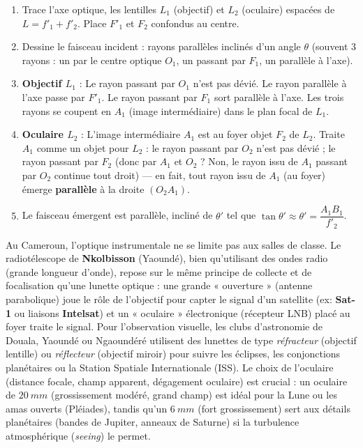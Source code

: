 \documentclass[11pt]{article}
\begin{document}
\begin{methode}
\begin{enumerate}
\item Trace l'axe optique, les lentilles $L_1$ (objectif) et $L_2$ (oculaire) espacées de $L = f'_1 + f'_2$. Place $F'_1$ et $F_2$ confondus au centre.
\item Dessine le faisceau incident : rayons parallèles inclinés d'un angle $\theta$ (souvent 3 rayons : un par le centre optique $O_1$, un passant par $F_1$, un parallèle à l'axe).
\item \textbf{Objectif $L_1$} : Le rayon passant par $O_1$ n'est pas dévié. Le rayon parallèle à l'axe passe par $F'_1$. Le rayon passant par $F_1$ sort parallèle à l'axe. Les trois rayons se coupent en $A_1$ (image intermédiaire) dans le plan focal de $L_1$.
\item \textbf{Oculaire $L_2$} : L'image intermédiaire $A_1$ est au foyer objet $F_2$ de $L_2$. Traite $A_1$ comme un objet pour $L_2$ : le rayon passant par $O_2$ n'est pas dévié ; le rayon passant par $F_2$ (donc par $A_1$ et $O_2$ ? Non, le rayon issu de $A_1$ passant par $O_2$ continue tout droit) — en fait, tout rayon issu de $A_1$ (au foyer) émerge \textbf{parallèle} à la droite $(O_2 A_1)$.
\item Le faisceau émergent est parallèle, incliné de $\theta'$ tel que $\tan\theta' \approx \theta' = \dfrac{A_1B_1}{f'_2}$.
\end{enumerate}
\end{methode}

\begin{savaistu}
Au Cameroun, l'optique instrumentale ne se limite pas aux salles de classe. Le radiotélescope de \textbf{Nkolbisson} (Yaoundé), bien qu'utilisant des ondes radio (grande longueur d'onde), repose sur le même principe de collecte et de focalisation qu'une lunette optique : une grande « ouverture » (antenne parabolique) joue le rôle de l'objectif pour capter le signal d'un satellite (ex: \textbf{Sat-1} ou liaisons \textbf{Intelsat}) et un « oculaire » électronique (récepteur LNB) placé au foyer traite le signal. Pour l'observation visuelle, les clubs d'astronomie de Douala, Yaoundé ou Ngaoundéré utilisent des lunettes de type \emph{réfracteur} (objectif lentille) ou \emph{réflecteur} (objectif miroir) pour suivre les éclipses, les conjonctions planétaires ou la Station Spatiale Internationale (ISS). Le choix de l'oculaire (distance focale, champ apparent, dégagement oculaire) est crucial : un oculaire de $\SI{20}{mm}$ (grossissement modéré, grand champ) est idéal pour la Lune ou les amas ouverts (Pléiades), tandis qu'un $\SI{6}{mm}$ (fort grossissement) sert aux détails planétaires (bandes de Jupiter, anneaux de Saturne) si la turbulence atmosphérique (\emph{seeing}) le permet.
\end{savaistu}
\end{document}
